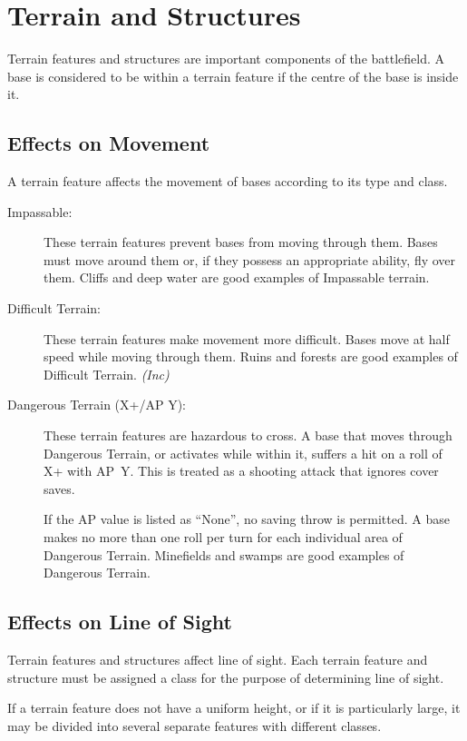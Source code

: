 \section{Terrain and Structures}

Terrain features and structures are important components of the battlefield. A base is considered to be within a terrain feature if the centre of the base is inside it.

\subsection{Effects on Movement}

A terrain feature affects the movement of bases according to its type and class.

\begin{description}
    \item[Impassable:] These terrain features prevent bases from moving through them. Bases must move around them or, if they possess an appropriate ability, fly over them. Cliffs and deep water are good examples of Impassable terrain.

    \item[Difficult Terrain:] These terrain features make movement more difficult. Bases move at half speed while moving through them. Ruins and forests are good examples of Difficult Terrain. \textit{(Inc)}

    \item[Dangerous Terrain (X+/AP Y):] These terrain features are hazardous to cross. A base that moves through Dangerous Terrain, or activates while within it, suffers a hit on a roll of X+ with AP~Y. This is treated as a shooting attack that ignores cover saves.

    If the AP value is listed as ``None'', no saving throw is permitted. A base makes no more than one roll per turn for each individual area of Dangerous Terrain. Minefields and swamps are good examples of Dangerous Terrain.
\end{description}

\subsection{Effects on Line of Sight}

Terrain features and structures affect line of sight. Each terrain feature and structure must be assigned a class for the purpose of determining line of sight.

If a terrain feature does not have a uniform height, or if it is particularly large, it may be divided into several separate features with different classes.

